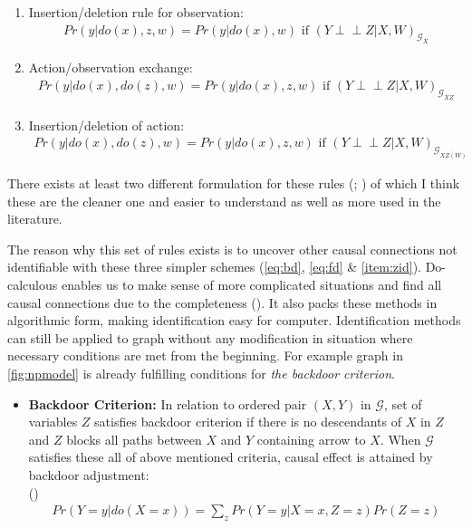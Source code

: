 \documentclass[main=english,12pt,a4paper,pdftex,econ,utf8]{aaltothesis}
\newcommand{\indep}{\perp \!\!\! \perp}
\newcommand{\g}{\mathcal{G}}
\begin{document}
\begin{enumerate}
    \item Insertion/deletion rule for observation:
        \begin{gather} \label{eq:do1}
            Pr(y|do(x),z,w)=Pr(y|do(x),w)\text{ if }(Y\indep Z|X,W)_{\g_{\overline{X}}}
        \end{gather}
    \item Action/observation exchange:
        \begin{gather} \label{eq:do2}
            Pr(y|do(x), do(z), w)=Pr(y|do(x),z,w)\text{ if }(Y\indep Z|X,W)_{\g_{\overline{X}\underline{Z}}}
        \end{gather}
    \item Insertion/deletion of action:
        \begin{gather} \label{eq:do3}
            Pr(y|do(x),do(z),w)=Pr(y|do(x),z,w)\text{ if }(Y\indep Z|X,W)_{\g_{\overline{XZ(W)}}}
        \end{gather}
    \label{list:do}
\end{enumerate}

\noindent There exists at least two different formulation for these rules (\cite{Jud1995}; \cite{Pearl2009a}) of which I think these are the cleaner one and easier to understand as well as more used in the literature.

The reason why this set of rules exists is to uncover other causal connections not identifiable with these three simpler schemes (\ref{eq:bd}, \ref{eq:fd} \& \ref{item:zid}). Do-calculous enables us to make sense of more complicated situations and find all causal connections due to the completeness (\cite{Pearl2016}). It also packs these methods in algorithmic form, making identification easy for computer. Identification methods can still be applied to graph without any modification in situation where necessary conditions are met from the beginning. For example graph in \ref{fig:npmodel} is already fulfilling conditions for \textit{the backdoor criterion}.

\begin{itemize}
    \item[] \textbf{Backdoor Criterion:} In relation to ordered pair $(X,Y)$ in $\g$, set of variables $Z$ satisfies backdoor criterion if there is no descendants of $X$ in $Z$ and $Z$ blocks all paths between $X$ and $Y$ containing arrow to $X$. When $\g$ satisfies these all of above mentioned criteria, causal effect is attained by backdoor adjustment: \\ 
    (\cite{Pearl2016})
    \begin{align}\label{eq:bd}
        Pr(Y=y|do(X=x))=\sum_{z}Pr(Y=y|X=x,Z=z)Pr(Z=z)
    \end{align}
\end{itemize}
\end{document}

